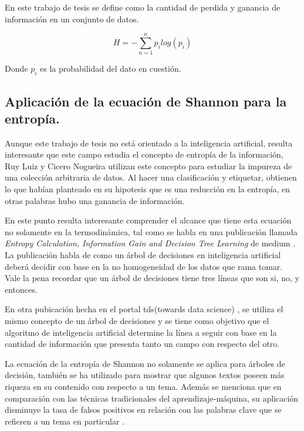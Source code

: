 En este trabajo de tesis se define como la cantidad de perdida y ganancia de información en un conjunto de datos.

\begin{equation}
	H = - \sum_{n=1}^{n} p_i log(p_i)
\end{equation}

Donde $p_i$ es la probabilidad del dato en cuestión. 

\subsection{Aplicación de la ecuación de Shannon para la entropía.}

Aunque este trabajo de tesis no está orientado a la inteligencia artificial, resulta interesante que este campo estudia el concepto de entropía de la información, Ruy Luiz y Cicero Nogueira utilizan este concepto para estudiar la impureza de una colección arbitraria de datos. Al hacer una clasificación y etiquetar, obtienen lo que habían planteado en su hipotesis que es una reducción en la entropía, en otras palabras hubo una ganancia de información\citep[página 14][]{dos2012entropy}. 

En este punto resulta interesante comprender el alcance que tiene esta ecuación no solamente en la termodinámica, tal como se habla en una publicación llamada \textit{Entropy Calculation, Information Gain and Decision Tree Learning} de medium \citep[][]{medium}. La publicación habla de como un árbol de decisiones en inteligencia artificial deberá decidir con base en la no homogeneidad de los datos que rama tomar. Vale la pena recordar que un árbol de decisiones tiene tres líneas que son si, no, y entonces. 

En otra pubicación hecha en el portal tds(towards data science) \citep[][]{tds}, se utiliza el mismo concepto de un árbol de decisiones y se tiene como objetivo que el algoritmo de inteligencia artificial determine la línea a seguir con base en la cantidad de información que presenta tanto un campo con respecto del otro. 

La ecuación de la entropía de Shannon no solamente se aplica para árboles de decisión, también se ha utilizado para mostrar que algunos textos poseen más riqueza en su contenido con respecto a un tema. Además se menciona que en comparación con las técnicas tradicionales del aprendizaje-máquina, su aplicación disminuye la tasa de falsos positivos en relación con las palabras clave que se refieren a un tema en particular \citep[][]{chan2022knowledge} .   
 


